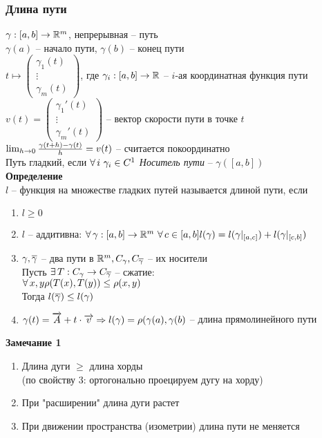 \documentclass[12pt]{article}
\begin{document}
\subsubsection{Длина пути}
$\gamma: [a,b] \rightarrow \mathbb{R}^m$, непрерывная -- путь\\
$\gamma(a)$ -- начало пути, $\gamma(b)$ -- конец пути\\
$t \mapsto \begin{pmatrix}
\gamma_1(t)\\
\vdots\\
\gamma_m(t)
\end{pmatrix}$, где $\gamma_i: [a,b] \rightarrow \mathbb{R}$ -- $i$-ая координатная функция пути\\
$v(t) = \begin{pmatrix}
    \gamma_1'(t)\\
    \vdots\\
    \gamma_m'(t)
\end{pmatrix}$ -- вектор скорости пути в точке $t$\\
$\lim_{h\rightarrow 0}\frac{\gamma(t+h)-\gamma(t)}{h} = v(t)$ -- считается покоординатно\\
Путь гладкий, если $\forall\, i\ \gamma_i \in C^1$
\textit{Носитель пути} -- $\gamma([a,b])$\\
\textbf{Определение}\\
$l$ -- функция на множестве гладких путей называется длиной пути, если
\begin{enumerate}
    \item $l \geq 0$
    \item $l$ -- аддитивна:
    $\forall\, \gamma: [a,b] \rightarrow \mathbb{R}^m\ \forall\, c \in [a,b] l(\gamma) = l(\gamma|_{[a,c]})+l(\gamma|_{[c,b]})$
    \item $\gamma, \overline\gamma$ -- два пути в $\mathbb{R}^m, C_\gamma, C_{\overline\gamma}$ -- их носители\\
    Пусть $\exists\, T: C_\gamma \rightarrow C_{\overline \gamma}$ -- сжатие:\\
    $\forall\, x,y \rho(T(x), T(y)) \leq \rho(x,y)$\\
    Тогда $l(\overline \gamma) \leq l(\gamma)$
    \item $\gamma(t) = \overrightarrow A+t\cdot\overrightarrow v \Rightarrow l(\gamma) = \rho(\gamma(a), \gamma(b)$ -- длина прямолинейного пути
\end{enumerate}
\textbf{Замечание 1}\\
\begin{enumerate}
    \item Длина дуги $\geq$ длина хорды\\
    (по свойству 3: ортогонально проецируем дугу на хорду)
    \item При "расширении" длина дуги растет
    \item При движении пространства (изометрии) длина пути не меняется
\end{enumerate}
\end{document}
